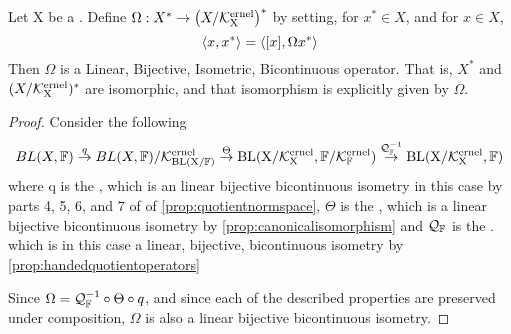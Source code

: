 \begin{thm}
\label{thm:dualspaceisomorphism}
    Let X be a 
    \SeminormedSpace.
    Define $\Omega:X^* \to \left( X/\bf\mathcal{K}\rm^{ernel}_X\right)^*$
    by setting, for $x^* \in X$, 
    and for $x \in X$, 
    \begin{equation}
        \left\langle x, x^* \right\rangle = \left\langle [x], \Omega x^* \right\rangle
    \end{equation}
    Then $\Omega$ is a 
    Linear, 
    Bijective, 
    Isometric, 
    Bicontinuous operator. 
    That is, $X^*$ and $(X/\bf\mathcal{K}\rm^{ernel}_X)^*$ are 
    isomorphic, and that isomorphism is explicitly
    given by $\Omega$. 
    \begin{proof}
        Consider the following
        \begin{equation}
            BL(X,\mathbb{F}) \overset{q}{\to} BL(X,\mathbb{F})/\bf\mathcal{K}\rm^{ernel}_{BL(X/\mathbb{F})} \overset{\Theta}{\to} BL(X/\bf\mathcal{K}\rm^{ernel}_X, \mathbb{F}/\bf\mathcal{K}\rm^{ernel}_{\mathbb{F}}) \overset{\mathcal{Q}_{\mathbb{F}}^{-1}}{\to} BL(X/\bf\mathcal{K}\rm^{ernel}_X,\mathbb{F})
        \end{equation}
        where
        q is the \QuotientMap, 
        which is an linear bijective bicontinuous isometry in this case
        by parts 4, 5, 6, and 7 of 
        of \ref{prop:quotientnormspace}, 
        $\Theta$ is the \CanonicalIso, 
        which is a linear bijective bicontinuous isometry by 
        \ref{prop:canonicalisomorphism}
        and $\mathcal{Q}_{\mathbb{F}}$ is the \CodomainQuotientMap.
        which is in this case a linear, bijective, bicontinuous isometry
        by \ref{prop:handedquotientoperators}


        Since $\Omega=\mathcal{Q}_{\mathbb{F}}^{-1} \circ \Theta \circ q$, 
        and since each of the described properties
        are preserved under composition, 
        $\Omega$ is also a 
        linear bijective bicontinuous isometry. 
    \end{proof}
\end{thm}
